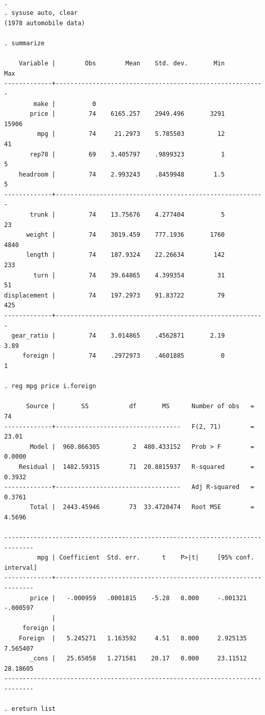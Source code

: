 \documentclass[
  letterpaper,
  DIV=11,
  numbers=noendperiod]{scrartcl}
\begin{document}
\begin{verbatim}

. 
. sysuse auto, clear
(1978 automobile data)

. summarize

    Variable |        Obs        Mean    Std. dev.       Min        Max
-------------+---------------------------------------------------------
        make |          0
       price |         74    6165.257    2949.496       3291      15906
         mpg |         74     21.2973    5.785503         12         41
       rep78 |         69    3.405797    .9899323          1          5
    headroom |         74    2.993243    .8459948        1.5          5
-------------+---------------------------------------------------------
       trunk |         74    13.75676    4.277404          5         23
      weight |         74    3019.459    777.1936       1760       4840
      length |         74    187.9324    22.26634        142        233
        turn |         74    39.64865    4.399354         31         51
displacement |         74    197.2973    91.83722         79        425
-------------+---------------------------------------------------------
  gear_ratio |         74    3.014865    .4562871       2.19       3.89
     foreign |         74    .2972973    .4601885          0          1

. reg mpg price i.foreign

      Source |       SS           df       MS      Number of obs   =        74
-------------+----------------------------------   F(2, 71)        =     23.01
       Model |  960.866305         2  480.433152   Prob > F        =    0.0000
    Residual |  1482.59315        71  20.8815937   R-squared       =    0.3932
-------------+----------------------------------   Adj R-squared   =    0.3761
       Total |  2443.45946        73  33.4720474   Root MSE        =    4.5696

------------------------------------------------------------------------------
         mpg | Coefficient  Std. err.      t    P>|t|     [95% conf. interval]
-------------+----------------------------------------------------------------
       price |   -.000959   .0001815    -5.28   0.000     -.001321    -.000597
             |
     foreign |
    Foreign  |   5.245271   1.163592     4.51   0.000     2.925135    7.565407
       _cons |   25.65058   1.271581    20.17   0.000     23.11512    28.18605
------------------------------------------------------------------------------

. ereturn list


\end{verbatim}
\end{document}

